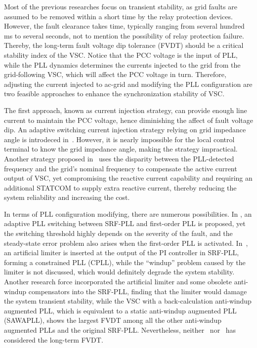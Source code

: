 \documentclass[10pt,final,journal,twoside]{IEEEtran}
\begin{document}
Most of the previous researches focus on transient stability, as grid faults are assumed to be removed within a short time by the relay protection devices. However, the fault clearance takes time,
typically ranging from several hundred ms to several seconds, not to mention the possibility of relay protection failure. Thereby, the long-term fault voltage dip tolerance (FVDT) should be a critical
stability index of the VSC. Notice that the PCC voltage is the input of PLL, while the PLL dynamics determines the currents injected to
the grid from the grid-following VSC, which will affect the PCC voltage in turn\cite{dong2015}. Therefore, adjusting the current injected to ac-grid and modifying the PLL configuration are two feasible
approaches to enhance the synchronization stability of VSC.

The first approach, known as current injection strategy, can provide enough line current to maintain the PCC voltage, hence diminishing the affect of fault voltage dip.
An adaptive switching current injection strategy relying on grid impedance angle is introdeced in~\cite{ma2018}. However, it is nearly impossible for the local control terminal to know the grid
impedance angle, making the strategy impractical. Another strategy proposed in~\cite{geng2018} uses the disparity between the PLL-detected frequency and the grid's nominal frequency to
compensate the active current output of VSC, yet compromising the reactive current capability and requiring an additional STATCOM to supply extra reactive current, thereby reducing the system reliability
and increasing the cost.

In terms of PLL configuration modifying, there are numerous possibilities. In \cite{wu2020},
an adaptive PLL switching between SRF-PLL and first-order PLL is proposed, yet the switching threshold highly depends on the severity of the fault, and the steady-state error problem
also arises when the first-order PLL is activated. In~\cite{tang2023}, an artificial limiter is inserted at the output of the PI controller in SRF-PLL, forming a constrained PLL (CPLL), while
the ``windup'' problem caused by the limiter is not discussed, which would definitely degrade the system stability\cite{lozier1956,stein2003,bookofzac}. Another research force incorporated
the artificial limiter and some obsolete anti-windup compensators into the SRF-PLL\cite{chen2023}, finding that the limiter would damage the system transient stability, while the VSC with a back-calculation
anti-windup augmented PLL, which is equivalent to a static anti-windup augmented PLL (SAWAPLL), shows the largest FVDT among all the other anti-windup augmented PLLs and the original SRF-PLL.
Nevertheless, neither~\cite{chen2023} nor~\cite{tang2023} has considered the long-term FVDT.
\end{document}

